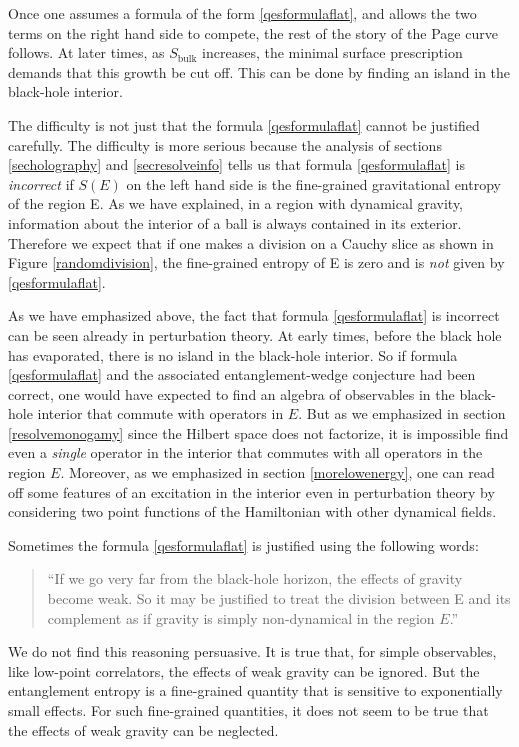 \documentclass[12pt]{article}
\begin{document}
Once one assumes a formula of the form \eqref{qesformulaflat}, and allows the two terms on the right hand side to compete, the rest of the story of the Page curve follows. At later times, as $S_{\text{bulk}}$ increases, the minimal surface prescription demands that this growth be cut off.  This can be done by finding an island in the black-hole interior.  

The difficulty is not just that the formula \eqref{qesformulaflat} cannot be justified carefully. The difficulty is more serious because the analysis of sections \ref{secholography} and \ref{secresolveinfo} tells us that formula \eqref{qesformulaflat} is {\em incorrect} if $S(E)$ on the left hand side is the fine-grained gravitational entropy of the region E. As we have explained, in a region with dynamical gravity, information about the interior of a ball is always contained in its exterior. Therefore we expect that if one makes a division on a Cauchy slice as shown in Figure \ref{randomdivision}, the fine-grained entropy of E is zero and is {\em not} given by \eqref{qesformulaflat}. 

As we have emphasized above, the fact that formula \eqref{qesformulaflat} is incorrect can be seen already in perturbation theory. At early times, before the black hole has evaporated, there is no island in the black-hole interior. So if formula \eqref{qesformulaflat} and the associated entanglement-wedge conjecture had been correct, one would have expected to find an algebra of observables in the black-hole interior that commute with operators in $E$. But as we emphasized  in section \ref{resolvemonogamy} since the Hilbert space does not factorize, it is impossible  find even a {\em single} operator in the interior that commutes with all operators in the region $E$. Moreover, as we emphasized in section \ref{morelowenergy}, one can read off some features of an excitation in the interior even in perturbation theory by considering two point functions of the Hamiltonian with other dynamical fields.

Sometimes the formula \eqref{qesformulaflat} is justified using the following words:  
\begin{quote}
``If we go very far from the black-hole horizon, the effects of  gravity become weak. So it may be justified to treat the division between E and 
its complement as if gravity is simply non-dynamical in the region $E$.''
\end{quote}
We do not find this reasoning persuasive. It is true that, for simple observables, like low-point correlators, the effects of weak gravity can be ignored.  But 
the entanglement entropy is a fine-grained quantity that is sensitive to exponentially small effects. For such fine-grained quantities, it does not seem to be true that the effects of weak gravity can be neglected.
\end{document}
